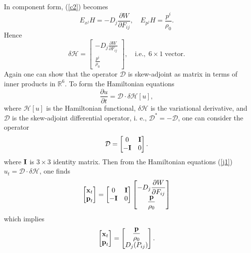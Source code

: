 \documentclass[11pt,letter,subeqn,fleqn]{article}
\numberwithin{equation}{section}
\numberwithin{table}{section}
\numberwithin{figure}{section}
\def\beq{\begin{equation}}
\def\eeq{\end{equation}}
\def\vec#1{{\boldsymbol{\rm #1}}} %
\def\vec#1{{\boldsymbol{\rm #1}}} %
\begin{document}
In component form, (\ref{c2}) becomes
\begin{equation}\label{c3}
E_{{x}^{j}}H=-D_{j}\frac{\partial W}{\partial {F_{ij}}}, \quad E_{{p}^{j}}H=\frac{{p}^{i}}{\rho_{0}}.
\end{equation}
Hence
\begin{equation*}
\delta	\mathcal{H} =
\begin{bmatrix}
\displaystyle -D_{j}\frac{\partial W}{\partial {F_{ij}}}\\
\displaystyle	\frac{{p}^{i}}{\rho_{0}}
\end{bmatrix},\quad \mathrm{i. e.,\; 6\times 1\; vector}.
\end{equation*}
Again one can show that the operator $\mathcal{D}$ is skew-adjoint as matrix in terms of inner products in $\mathbb{R}^{6}$. To form the Hamiltonian equations
\beq\label{j1}
\frac{\partial u}{\partial t}=\mathcal{D}\cdot \delta \mathcal{H}[u],
\eeq
where $\mathcal{H}[u]$ is the Hamiltonian functional, $\delta \mathcal{H}$ is the variational derivative, and $\mathcal{D}$ is the skew-adjoint differential operator, i. e., $\mathcal{D}^{*}=-\mathcal{D}$, one can consider the operator
\begin{equation*}
\mathcal{D} =
\begin{bmatrix}
0&\vec{I}\\
-\vec{I}&0
\end{bmatrix}.
\end{equation*}
where $\vec{I}$ is $3\times 3$ identity matrix. Then from the Hamiltonian equations (\ref{j1}) $u_{t}=\mathcal{D}\cdot \delta\mathcal{H}$, one finds
\begin{equation*}\label{c4}
\begin{bmatrix}
\vec{x}_{t}\\
\vec{p}_{t}
\end{bmatrix}	=	\begin{bmatrix}
0&\vec{I}\\
-\vec{I}&0
\end{bmatrix}
\begin{bmatrix}
\displaystyle 	-D_{j}\frac{\partial W}{\partial {F_{ij}}}\\
\displaystyle 	\frac{\vec{p}}{\rho_{0}}
\end{bmatrix}
\end{equation*}
which implies \begin{equation}\label{c5}
\begin{bmatrix}
\vec{x}_{t}\\
\vec{p}_{t}
\end{bmatrix}=	
\begin{bmatrix}
\displaystyle \frac{\vec{p}}{\rho_{0}}\\
\displaystyle D_{j}(P_{ij})
\end{bmatrix}.
\end{equation}	
\end{document}
